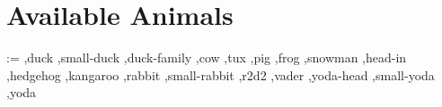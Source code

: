 \documentclass[]{article}
\makeatletter
\newcommand*{\availableAnimal}[1]{\@for\cs:=#1\do{%
  \ifx\cs\@empty\else%
    \rlap{\expandafter\ducksay\expandafter[\cs]{\cs}}\hfill\mbox{}\\[1ex]%
  \fi%
}}
\makeatother
\begin{document}
\section{Available Animals}\label{sec:animals}%
\small
\begin{multicols}{2}
\raggedbottom
\availableAnimal{%
  ,duck%
  ,small-duck%
  ,duck-family%
  ,cow%
  ,tux%
  ,pig%
  ,frog%
  ,snowman%
  ,head-in%
  ,hedgehog%
  ,kangaroo%
  ,rabbit%
  ,small-rabbit%
  ,r2d2%
  ,vader%
  ,yoda-head%
  ,small-yoda%
  ,yoda%
}%
\end{multicols}
\clearpage
\thispagestyle{empty}
\bgroup
\Huge
\mbox{}\vfill
\centering
{}
\vfill
\hfill{}
\egroup
\end{document}
